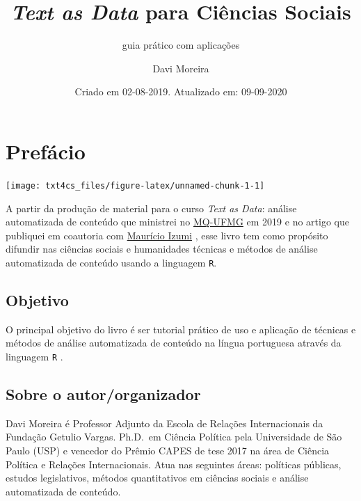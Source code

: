\documentclass[]{book}
\title{\emph{Text as Data} para Ciências Sociais}
\subtitle{guia prático com aplicações}
\author{Davi Moreira}
\date{Criado em 02-08-2019. Atualizado em: 09-09-2020}
\begin{document}
\maketitle

{
\hypersetup{linkcolor=}
\setcounter{tocdepth}{1}
\tableofcontents
}
\hypertarget{prefuxe1cio}{%
\chapter*{Prefácio}\label{prefuxe1cio}}

\begin{center}\texttt{[image: txt4cs\_files/figure-latex/unnamed-chunk-1-1]} \end{center}

A partir da produção de material para o curso \emph{Text as Data}: análise automatizada de conteúdo que ministrei no \href{http://www.fafich.ufmg.br/~mq/}{MQ-UFMG} em 2019 e no artigo que publiquei em coautoria com \href{http://lattes.cnpq.br/2546701843557096}{Maurício Izumi} \citep{izumi_o_2018}, esse livro tem como propósito difundir nas ciências sociais e humanidades técnicas e métodos de análise automatizada de conteúdo usando a linguagem \texttt{R}.

\hypertarget{objetivo}{%
\section*{Objetivo}\label{objetivo}}

O principal objetivo do livro é ser tutorial prático de uso e aplicação de técnicas e métodos de análise automatizada de conteúdo na língua portuguesa através da linguagem \texttt{R} .

\hypertarget{sobre-o-autororganizador}{%
\section*{Sobre o autor/organizador}\label{sobre-o-autororganizador}}

Davi Moreira é Professor Adjunto da Escola de Relações Internacionais da Fundação Getulio Vargas. Ph.D.~em Ciência Política pela Universidade de São Paulo (USP) e vencedor do Prêmio CAPES de tese 2017 na área de Ciência Política e Relações Internacionais. Atua nas seguintes áreas: políticas públicas, estudos legislativos, métodos quantitativos em ciências sociais e análise automatizada de conteúdo.
\end{document}
